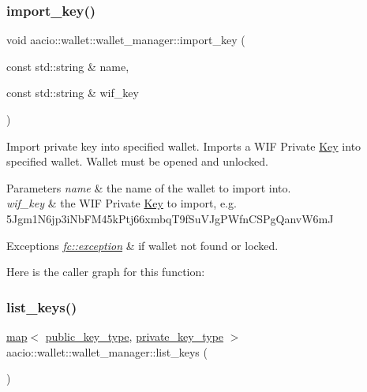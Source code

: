 \subsubsection{\texorpdfstring{import\+\_\+key()}{import\_key()}}
{\footnotesize\ttfamily void aacio\+::wallet\+::wallet\+\_\+manager\+::import\+\_\+key (\begin{DoxyParamCaption}\item[{const std\+::string \&}]{name,  }\item[{const std\+::string \&}]{wif\+\_\+key }\end{DoxyParamCaption})}

Import private key into specified wallet. Imports a W\+IF Private \mbox{\hyperlink{struct_key}{Key}} into specified wallet. Wallet must be opened and unlocked. 
\begin{DoxyParams}{Parameters}
{\em name} & the name of the wallet to import into. \\
\hline
{\em wif\+\_\+key} & the W\+IF Private \mbox{\hyperlink{struct_key}{Key}} to import, e.\+g. 5\+Jgm1\+N6jp3i\+Nb\+F\+M45k\+Ptj66xmbq\+T9f\+Su\+V\+Jg\+P\+Wfn\+C\+S\+Pg\+Qanv\+W6mJ \\
\hline
\end{DoxyParams}

\begin{DoxyExceptions}{Exceptions}
{\em \mbox{\hyperlink{classfc_1_1exception}{fc\+::exception}}} & if wallet not found or locked. \\
\hline
\end{DoxyExceptions}
Here is the caller graph for this function\+:
\mbox{\label{classaacio_1_1wallet_1_1wallet__manager_a4ab2d003046199009f52e6600f041dec}} 
\subsubsection{\texorpdfstring{list\+\_\+keys()}{list\_keys()}}
{\footnotesize\ttfamily \mbox{\hyperlink{classstd_1_1map}{map}}$<$ \mbox{\hyperlink{classfc_1_1crypto_1_1public__key}{public\+\_\+key\+\_\+type}}, \mbox{\hyperlink{classfc_1_1crypto_1_1private__key}{private\+\_\+key\+\_\+type}} $>$ aacio\+::wallet\+::wallet\+\_\+manager\+::list\+\_\+keys (\begin{DoxyParamCaption}{ }\end{DoxyParamCaption})}

